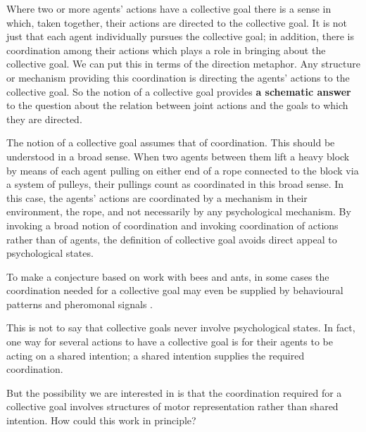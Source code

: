 \documentclass[12pt,\papersize]{extarticle}
\begin{document}
Where two or more agents' actions have a collective goal there is a sense in which, taken together, their actions are directed to the collective goal.  
It is not just that each agent individually pursues the collective goal; in addition, there is coordination among their actions which plays a role in bringing about the collective goal.  
We can put this in terms of the direction metaphor.  
Any structure or mechanism providing this coordination is directing the agents' actions to the collective goal.  
So the notion of a collective goal provides \textbf{a schematic answer} to the question about the relation between joint actions and the goals to which they are directed.

The notion of a collective goal assumes that of coordination.  This should be understood in a broad sense.  
When two agents between them lift a heavy block by means of each agent pulling on either end of a rope connected to the block via a system of pulleys, their pullings count as coordinated in this broad sense.  
In this case, the agents' actions are coordinated by a mechanism in their environment, the rope, and not necessarily by any psychological mechanism.  
By invoking a broad notion of coordination 
and invoking coordination of actions rather than of agents,
the definition of collective goal avoids direct appeal to psychological states.

To make a conjecture based on work with bees and ants, in some cases
the coordination needed for a collective goal may even be supplied by 
	 behavioural patterns \citep{seeley2010honeybee}  
	 and 
	 pheromonal signals \citep[pp.\ 178-83, 206-21]{hoelldobler2009superorganism}.


This is not to say that collective goals never involve psychological states.
In fact,
one way for several actions to have a collective goal is for their agents to be acting on a shared intention; 
a shared intention supplies the required coordination.

But the possibility we are interested in is that the coordination required for a collective goal involves structures of motor representation rather than shared intention.
How could this work in principle?
\end{document}
